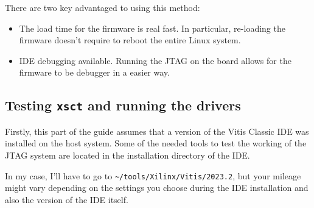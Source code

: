 \documentclass[10pt]{article}
\begin{document}
There are two key advantaged to using this method:
\begin{itemize}
\item The load time for the firmware is real fast. In particular, re-loading the
firmware doesn't require to reboot the entire Linux system.
\item IDE debugging available. Running the JTAG on the board allows for the firmware
to be debugger in a easier way.
\end{itemize}

\subsection{Testing \texttt{xsct} and running the drivers}
\label{sec:orgf33f6b7}
Firstly, this part of the guide assumes that a version of the Vitis Classic IDE
was installed on the host system. Some of the needed tools to test the working of the JTAG
system are located in the installation directory of the IDE.

In my case, I'll have to go to \texttt{\textasciitilde{}/tools/Xilinx/Vitis/2023.2}, but your mileage might vary
depending on the settings you choose during the IDE installation and also the version of
the IDE itself.
\end{document}
